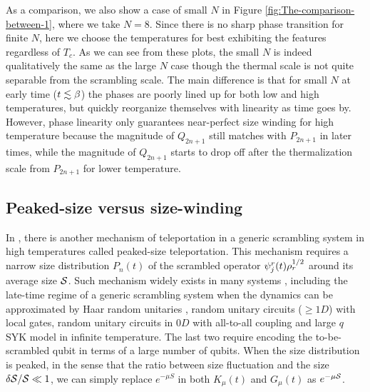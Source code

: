 \documentclass[11pt]{article}
\renewcommand{\>}{\rangle}
\newcommand{\<}{\langle}
\begin{document}
As a comparison, we also show a case of small $N$ in Figure \ref{fig:The-comparison-between-1},
where we take $N=8$. Since there is no sharp phase transition for finite $N$, here we choose the temperatures for best exhibiting the features regardless of $T_c$. As we can see from these plots, the small $N$
is indeed qualitatively the same as the large $N$ case though the
thermal scale is not quite separable from the scrambling scale. The
main difference is that for small $N$ at early time ($t\lesssim\beta$)
the phases are poorly lined up for both low and high temperatures,
but quickly reorganize themselves with linearity as time goes by.
However, phase linearity only guarantees near-perfect size winding
for high temperature because the magnitude of $Q_{2n+1}$ still matches
with $P_{2n+1}$ in later times, while the magnitude of $Q_{2n+1}$
starts to drop off after the thermalization scale from $P_{2n+1}$ for
lower temperature. 

\subsection{Peaked-size versus size-winding \label{subsec:Average-size-and}}

In \cite{Schuster:2021uvg}, there is another mechanism of teleportation in a generic
scrambling system in high temperatures called peaked-size teleportation.
This mechanism requires a narrow size distribution $P_{n}(t)$ of
the scrambled operator $\psi_{j}^{r}(t)\rho_{r}^{1/2}$ around its average
size $\mathcal{S}$. Such mechanism widely exists in many systems \cite{Schuster:2021uvg},
including the late-time regime of a generic scrambling system when
the dynamics can be approximated by Haar random unitaries \cite{Hayden:2007cs, Roberts:2016hpo},
random unitary circuits ($\geq1D$) with local gates, random unitary
circuits in $0D$ with all-to-all coupling and large $q$ SYK model
in infinite temperature. The last two require encoding the to-be-scrambled
qubit in terms of a large number of qubits. When the size distribution
is peaked, in the sense that the ratio between size fluctuation and
the size $\delta\mathcal{S}/\mathcal{S}\ll1$, we can simply replace $e^{-\mu S}$ in
both $K_{\mu}(t)$ and $G_{\mu}(t)$ as $e^{-\mu\mathcal{S}}$.
\end{document}
